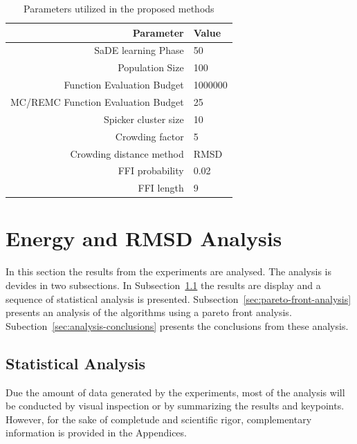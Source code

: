\begin{table}[ht]
    \centering
    \begin{tabular}{r|l} \hline \hline
        Parameter & Value \\ \hline \hline
        SaDE learning Phase & 50 \\ \hline
        Population Size & 100 \\ \hline
        Function Evaluation Budget & 1000000 \\ \hline
        MC/REMC Function Evaluation Budget & 25 \\ \hline
        Spicker cluster size & 10 \\ \hline
        Crowding factor & 5 \\ \hline
        Crowding distance method & RMSD \\ \hline
        \ac{FFI} probability & 0.02 \\ \hline
        \ac{FFI} length & 9 \\ \hline \hline
    \end{tabular}
    \caption{Parameters utilized in the proposed methods}
    \label{tab:parameters}
\end{table}

\section{Energy and \ac{RMSD} Analysis}\label{sec:methods-analysis}

In this section the results from the experiments are analysed. The analysis
is devides in two subsections. In Subsection~\ref{sec:statistical-analysis} the
results are display and a sequence of statistical analysis is presented.
Subsection~\ref{sec:pareto-front-analysis} presents an analysis of the algorithms
using a pareto front analysis. Subection~\ref{sec:analysis-conclusions} presents
the conclusions from these analysis.

\subsection{Statistical Analysis}\label{sec:statistical-analysis}

Due the amount of data generated by the experiments, most of the analysis will
be conducted by visual inspection or by summarizing the results and keypoints.
However, for the sake of completude and scientific rigor, complementary
information is provided in the Appendices.

